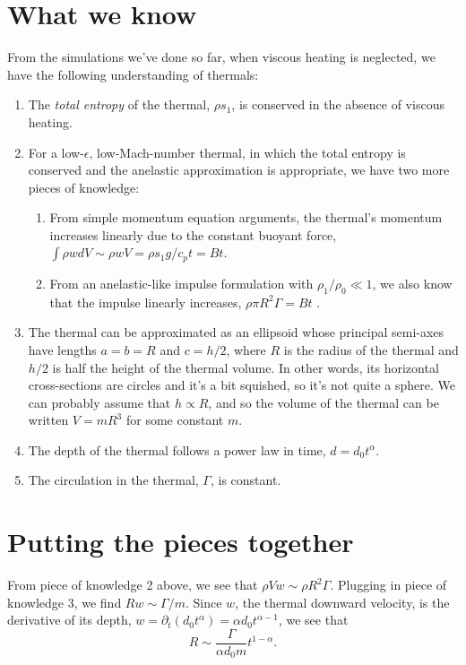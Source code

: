 \documentclass[onecolumn, amsmath, amsfonts, amssymb]{aastex62}
\begin{document}
\section{What we know}
From the simulations we've done so far, when viscous heating is neglected, we have the
following understanding of thermals:
\begin{enumerate}
\item The \emph{total entropy} of the thermal, $\rho s_1$, is conserved in the absence of
viscous heating.
\item For a low-$\epsilon$, low-Mach-number thermal, in which the total entropy is conserved
and the anelastic approximation is appropriate, we have two more pieces of knowledge:
\begin{enumerate}
\item From simple momentum equation arguments, the thermal's momentum increases linearly due
to the constant buoyant force, $\int \rho w dV \sim \rho w V = \rho s_1 g / c_p t = B t$.
\item From an anelastic-like impulse formulation with $\rho_1/\rho_0 \ll 1$, we also
know that the impulse linearly increases, $\rho \pi R^2 \Gamma = Bt$
\citep[][eqn 36 modified to buoyant vortex ring]{shivamoggi2010}.
\end{enumerate}
\item The thermal can be approximated as an ellipsoid whose principal semi-axes have lengths
$a = b = R$ and $c = h/2$, where $R$ is the radius of the thermal and $h/2$ is half the height
of the thermal volume. In other words, its horizontal cross-sections are circles and it's a bit
squished, so it's not quite a sphere. We can probably assume that $h \propto R$, and so
the volume of the thermal can be written $V = m R^3$ for some constant $m$.
\item The depth of the thermal follows a power law in time, $d = d_0t^\alpha$.
\item The circulation in the thermal, $\Gamma$, is constant.
\end{enumerate}

\section{Putting the pieces together}
From piece of knowledge 2 above, we see that $\rho V w \sim \rho R^2 \Gamma$. Plugging in
piece of knowledge 3, we find $R w \sim \Gamma / m$. Since $w$, the thermal downward velocity,
is the derivative of its depth, $w = \partial_t (d_0 t^\alpha) = \alpha d_0 t^{\alpha-1}$, 
we see that
\begin{equation}
R \sim \frac{\Gamma}{\alpha d_0 m} t^{1 - \alpha}.
\label{eqn:R_scale}
\end{equation}
\end{document}
